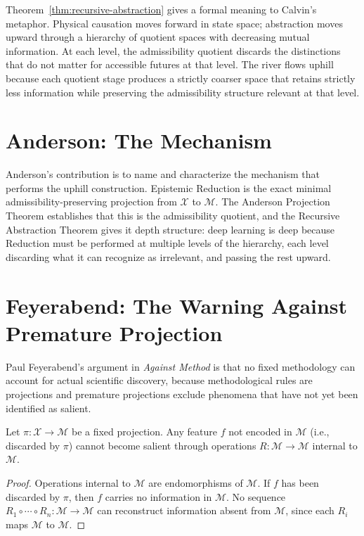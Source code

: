 \documentclass[12pt, a4paper, oneside]{book}
\newcommand{\X}{\mathcal{X}}
\newcommand{\M}{\mathcal{M}}
\newcommand{\proj}{\pi}
\begin{document}
\begin{remark}
Theorem~\ref{thm:recursive-abstraction} gives a formal meaning to
Calvin's metaphor. Physical causation moves forward in state space;
abstraction moves upward through a hierarchy of quotient spaces with
decreasing mutual information. At each level, the admissibility quotient
discards the distinctions that do not matter for accessible futures at
that level. The river flows uphill because each quotient stage produces
a strictly coarser space that retains strictly less information while
preserving the admissibility structure relevant at that level.
\end{remark}

\section{Anderson: The Mechanism}

Anderson's contribution is to name and characterize the mechanism that
performs the uphill construction. Epistemic Reduction is the exact
minimal admissibility-preserving projection from $\X$ to $\M$.
The Anderson Projection Theorem establishes that this is the admissibility
quotient, and the Recursive Abstraction Theorem gives it depth structure:
deep learning is deep because Reduction must be performed at multiple
levels of the hierarchy, each level discarding what it can recognize as
irrelevant, and passing the rest upward.

\section{Feyerabend: The Warning Against Premature Projection}

Paul Feyerabend's argument in \emph{Against Method} is that no fixed
methodology can account for actual scientific discovery, because
methodological rules are projections and premature projections exclude
phenomena that have not yet been identified as salient.

\begin{theorem}
\label{thm:feyerabend}
Let $\proj : \X \to \M$ be a fixed projection. Any feature $f$ not
encoded in $\M$ (i.e., discarded by $\proj$) cannot become salient
through operations $R : \M \to \M$ internal to $\M$.
\end{theorem}

\begin{proof}
Operations internal to $\M$ are endomorphisms of $\M$. If $f$ has been
discarded by $\proj$, then $f$ carries no information in $\M$. No
sequence $R_1 \circ \cdots \circ R_n : \M \to \M$ can reconstruct
information absent from $\M$, since each $R_i$ maps $\M$ to $\M$.
\end{proof}
\end{document}
